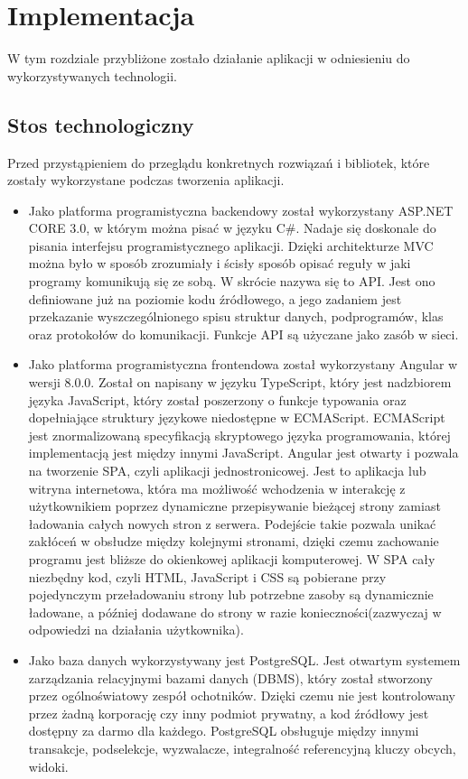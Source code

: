 \chapter{Implementacja}
W tym rozdziale przybliżone zostało działanie aplikacji w odniesieniu do wykorzystywanych technologii.

\section{Stos technologiczny}

Przed przystąpieniem do przeglądu konkretnych rozwiązań i bibliotek, które zostały wykorzystane podczas tworzenia aplikacji. 
\begin{itemize}
    \item Jako platforma programistyczna backendowy został wykorzystany ASP.NET CORE 3.0, w którym można pisać w języku C\#. Nadaje się doskonale do pisania interfejsu programistycznego aplikacji.\cite{asp} Dzięki architekturze MVC można było w sposób zrozumiały i ścisły sposób opisać reguły w jaki programy komunikują się ze sobą.\cite{asp} W skrócie nazywa się to API. Jest ono definiowane już na poziomie kodu źródłowego, a jego zadaniem jest przekazanie wyszczególnionego spisu struktur danych, podprogramów, klas oraz protokołów do komunikacji.\cite{api} Funkcje API są użyczane jako zasób w sieci.
    \item Jako platforma programistyczna frontendowa został wykorzystany Angular w wersji 8.0.0. Został on napisany w języku TypeScript, który jest nadzbiorem języka JavaScript, który został poszerzony o funkcje typowania oraz dopełniające struktury językowe niedostępne w ECMAScript.\cite{ts} ECMAScript jest znormalizowaną specyfikacją skryptowego języka programowania, której implementacją jest między innymi JavaScript. Angular jest otwarty i pozwala na tworzenie SPA, czyli aplikacji jednostronicowej. Jest to aplikacja lub witryna internetowa, która ma możliwość wchodzenia w interakcję z użytkownikiem poprzez dynamiczne przepisywanie bieżącej strony zamiast ładowania całych nowych stron z serwera. Podejście takie pozwala unikać zakłóceń w obsłudze między kolejnymi stronami, dzięki czemu zachowanie programu jest bliższe do okienkowej aplikacji komputerowej. W SPA cały niezbędny kod, czyli HTML, JavaScript i CSS są pobierane przy pojedynczym przeładowaniu strony lub potrzebne zasoby są dynamicznie ładowane, a później dodawane do strony w razie konieczności(zazwyczaj w odpowiedzi na działania użytkownika).\cite{spa}
    \item Jako baza danych wykorzystywany jest PostgreSQL. Jest otwartym systemem zarządzania relacyjnymi bazami danych (DBMS), który został stworzony przez ogólnoświatowy zespół ochotników. Dzięki czemu nie jest kontrolowany przez żadną korporację czy inny podmiot prywatny, a kod źródłowy jest dostępny za darmo dla każdego. PostgreSQL obsługuje między innymi transakcje, podselekcje, wyzwalacze, integralność referencyjną kluczy obcych, widoki.\cite{postgresql}
\end{itemize}
